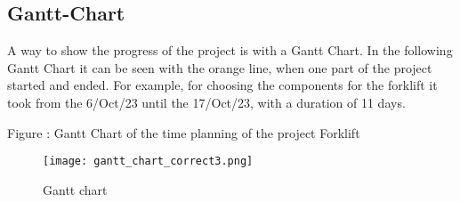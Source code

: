 \documentclass[../report.tex]{subfiles}
\begin{document}
    \subsection{Gantt-Chart}
    A way to show the progress of the project is with a Gantt Chart. 
    In the following Gantt Chart it can be seen with the orange line, 
    when one part of the project started and ended. For example, for 
    choosing the components for the forklift it took from the 6/Oct/23
     until the 17/Oct/23, with a duration of 11 days.



 Figure : Gantt Chart of the time planning of the project Forklift

 \begin{figure}[h!]
    \centering
    \texttt{[image: gantt\_chart\_correct3.png]}
    \caption{Gantt chart}
 \end{figure}
  
\end{document}
